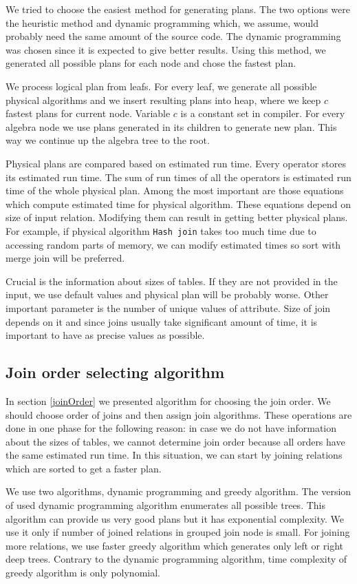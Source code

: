 We tried to choose the easiest method for generating plans. The two options were the heuristic method and dynamic programming which, we assume, would probably need the same amount of the source code. The dynamic programming was chosen since it is expected to give better results. Using this method, we generated all possible plans for each node and chose the fastest plan.

We process logical plan from leafs. For every leaf, we generate all possible physical algorithms and we insert resulting plans into heap, where we keep $c$ fastest plans for current node. Variable $c$ is a constant set in compiler.
For every algebra node we use plans generated in its children to generate new plan. This way we continue up the algebra tree to the root.

Physical plans are compared based on estimated run time. Every operator stores its estimated run time. The sum of run times of all the operators is estimated run time of the whole physical plan.
Among the most important are those equations which compute estimated time for physical algorithm. These equations depend on size of input relation. Modifying them can result in getting better physical plans. For example, if physical algorithm \texttt{Hash join} takes too much time due to accessing random parts of memory, we can modify estimated times so sort with merge join will be preferred.

Crucial is the information about sizes of tables. If they are not provided in the input, we use default values and physical plan will be probably worse. Other important parameter is the number of unique values of attribute. Size of join depends on it and since joins usually take significant amount of time, it is important to have as precise values as possible. 

\subsection{Join order selecting algorithm}


In section \ref{joinOrder} we presented algorithm for choosing the join order. We should choose order of joins and then assign join algorithms. These operations are done in one phase for the following reason: in case we do not have information about the sizes of tables, we cannot determine join order because all orders have the same estimated run time. In this situation, we can start by joining relations which are sorted to get a faster plan.

We use two algorithms, dynamic programming and greedy algorithm. The version of used dynamic programming algorithm enumerates all possible trees. This algorithm can provide us very good plans but it has exponential complexity. We use it only if number of joined relations in grouped join node is small. For joining more relations, we use faster greedy algorithm which generates only left or right deep trees. Contrary to the dynamic programming algorithm, time complexity of greedy algorithm is only polynomial.

